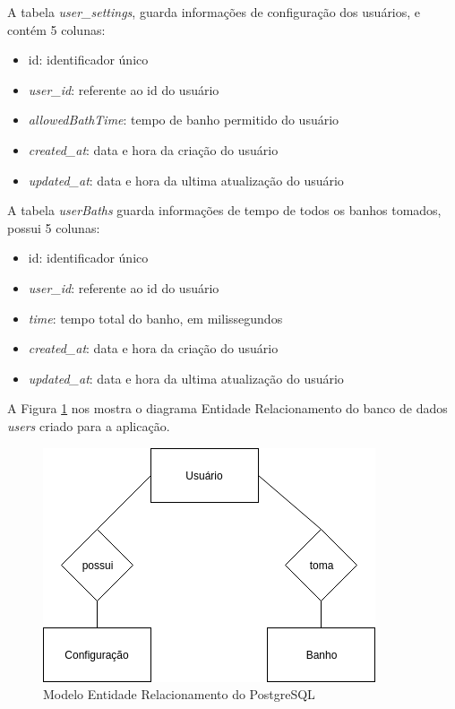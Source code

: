 A tabela \textit{user\_settings}, guarda informações de configuração dos usuários, e contém 5 colunas:

\begin{itemize}
	\item id: identificador único
	\item \textit{user\_id}: referente ao id do usuário
	\item \textit{allowedBathTime}: tempo de banho permitido do usuário
	\item \textit{created\_at}: data e hora da criação do usuário
	\item \textit{updated\_at}: data e hora da ultima atualização do usuário
\end{itemize}

A tabela \textit{userBaths} guarda informações de tempo de todos os banhos tomados, possui 5 colunas:

\begin{itemize}
	\item id: identificador único
	\item \textit{user\_id}: referente ao id do usuário
	\item \textit{time}: tempo total do banho, em milissegundos
	\item \textit{created\_at}: data e hora da criação do usuário
	\item \textit{updated\_at}: data e hora da ultima atualização do usuário
\end{itemize}

A Figura \ref{fig:erpostgre} nos mostra o diagrama Entidade Relacionamento do banco de dados \textit{users} criado para a aplicação.

\begin{figure}[htbp]
	\centering
	\includegraphics[width=0.6\linewidth]{figuras/ERPostgre.png}
	\caption{Modelo Entidade Relacionamento do PostgreSQL}
	\label{fig:erpostgre}
\end{figure}


